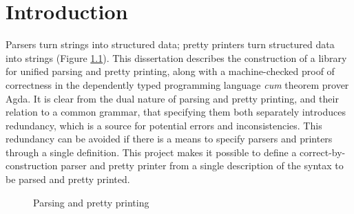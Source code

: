 \documentclass[12pt,a4paper,twoside,openright]{report}
\begin{document}
\pagestyle{headings}

\chapter{Introduction}

Parsers turn strings into structured data; pretty printers turn structured data into strings (Figure \ref{fig:intro}).
This dissertation describes the construction of a library for unified parsing and pretty printing, along with a machine-checked proof of correctness in the dependently typed programming language {\it cum} theorem prover Agda. 
It is clear from the dual nature of parsing and pretty printing, and their relation to a common grammar, that specifying them both separately introduces redundancy, which is a source for potential errors and inconsistencies. This redundancy can be avoided if there is a means to specify parsers and printers through a single definition.
This project makes it possible to define a correct-by-construction parser and pretty printer from a single description of the syntax to be parsed and pretty printed.
\begin{figure}[H] 
\begin{center}
\end{center}
\caption{Parsing and pretty printing}
\label{fig:intro}
\end{figure}
\end{document}
